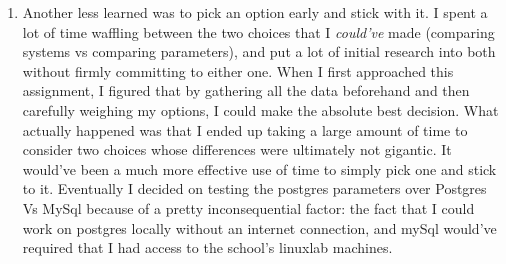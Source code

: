 \documentclass[11pt,letterpaper]{article}
\begin{document}
\begin{enumerate}
\begin{enumerate}
	\item Another less learned was to pick an option early and stick with it.  I spent a lot of time waffling between the two choices that I \textit{could've} made (comparing systems vs comparing parameters), and put a lot of initial research into both without firmly committing to either one.  When I first approached this assignment, I figured that by gathering all the data beforehand and then carefully weighing my options, I could make the absolute best decision.  What actually happened was that I ended up taking a large amount of time to consider two choices whose differences were ultimately not gigantic.  It would've been a much more effective use of time to simply pick one and stick to it.  Eventually I decided on testing the postgres parameters over Postgres Vs MySql because of a pretty inconsequential factor: the fact that I could work on postgres locally without an internet connection, and mySql would've required that I had access to the school's linuxlab machines.
	
	\end{enumerate}
	
\end{enumerate}	
\end{document}
